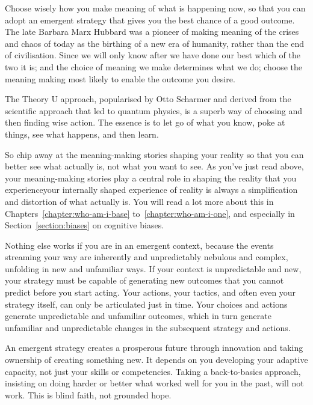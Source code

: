 Choose wisely how you make meaning of what is happening now, so that you can adopt an emergent strategy that gives you the best chance of a good outcome. The late Barbara Marx Hubbard was a pioneer of making meaning of the crises and chaos of today as the birthing of a new era of humanity\cite{hubbard-birth}, rather than the end of civilisation. Since we will only know after we have done our best which of the two it is; and the choice of meaning we make determines what we do; choose the meaning making most likely to enable the outcome you desire. 


The Theory U approach, popularised by Otto Scharmer\cite{scharmer-U} and derived from the scientific approach that led to quantum physics, is a superb way of choosing and then finding wise action. The essence is to let go of what you know, poke at things, see what happens, and then learn. 


So chip away at the meaning\hyp{}making stories shaping your reality so that you can better see what actually is, not what you want to see. As you've just read above, your meaning\hyp{}making stories play a central role in shaping the reality that you experience\textemdash your internally shaped experience of reality is always a simplification and distortion of what actually is. You will read a lot more about this in Chapters~\ref{chapter:who-am-i-base} to~\ref{chapter:who-am-i-one}, and especially in Section~\ref{section:biases} on cognitive biases. 


Nothing else works if you are in an emergent context, because the events streaming your way are inherently and unpredictably nebulous and complex, unfolding in new and unfamiliar ways. If your context is unpredictable and new, your strategy must be capable of generating new outcomes that you cannot predict before you start acting. Your actions, your tactics, and often even your strategy itself, can only be articulated just in time. Your choices and actions generate unpredictable and unfamiliar outcomes, which in turn generate unfamiliar and unpredictable changes in the subsequent strategy and actions. 


An emergent strategy creates a prosperous future through innovation and taking ownership of creating something new. It depends on you developing your adaptive capacity, not just your skills or competencies. Taking a back-to-basics approach, insisting on doing harder or better what worked well for you in the past, will not work. This is blind faith, not grounded hope.


